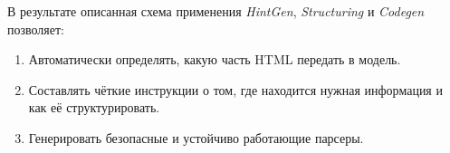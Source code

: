 В результате описанная схема применения \emph{HintGen}, \emph{Structuring} и \emph{Codegen} позволяет:
\begin{enumerate}
\item Автоматически определять, какую часть HTML передать в модель.
\item Составлять чёткие инструкции о том, где находится нужная информация и как её структурировать.
\item Генерировать безопасные и устойчиво работающие парсеры.
\end{enumerate}

